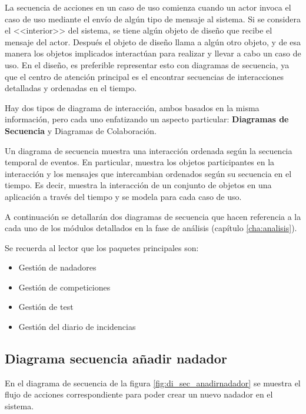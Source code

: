 		La secuencia de acciones en un caso de uso comienza cuando un actor invoca el caso de uso mediante el envío de algún tipo de mensaje al sistema. Si se considera el <<interior>> del sistema, se tiene algún objeto de diseño que recibe el mensaje del actor. Después el objeto de diseño llama a algún otro objeto, y de esa manera los objetos implicados interactúan para realizar y llevar a cabo un caso de uso. En el diseño, es preferible representar esto con diagramas de secuencia, ya que el centro de atención principal es el encontrar secuencias de interacciones detalladas y ordenadas en el tiempo.
		
		Hay dos tipos de diagrama de interacción, ambos basados en la misma información, pero cada uno enfatizando un aspecto particular: {\bf Diagramas de Secuencia} y Diagramas de Colaboración.
		
		Un diagrama de secuencia muestra una interacción ordenada según la secuencia temporal de eventos. En particular, muestra los objetos participantes en la interacción y los mensajes que intercambian ordenados según su secuencia en el tiempo. Es decir, muestra la interacción de un conjunto de objetos en una aplicación a través del tiempo y se modela para cada caso de uso.
		
		A continuación se detallarán dos diagramas de secuencia que hacen referencia a la cada uno de los módulos detallados en la fase de análisis (capítulo \ref{cha:analisis}).
		
		Se recuerda al lector que los paquetes principales son:
		\begin{itemize}
		  \item Gestión de nadadores
		  \item Gestión de competiciones
		  \item Gestión de test
		  \item Gestión del diario de incidencias
		\end{itemize}
		
		\subsection{Diagrama secuencia añadir nadador} %
		\label{sub:diagrama_secuencia_anadir_nadador}
			
			En el diagrama de secuencia de la figura \ref{fig:di_sec_anadirnadador} se muestra el flujo de acciones correspondiente para poder crear un nuevo nadador en el sistema.
			
